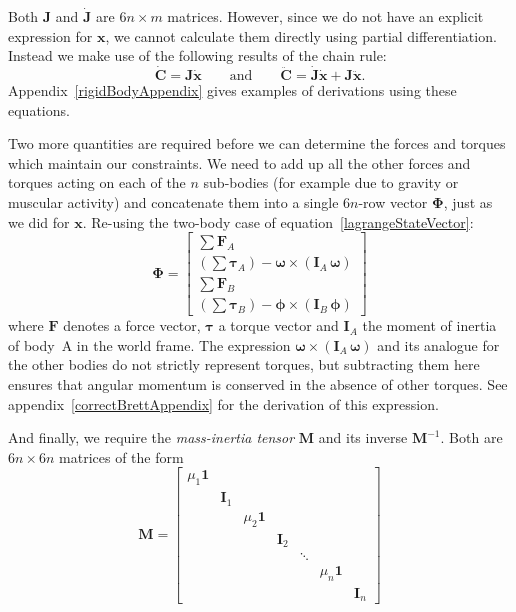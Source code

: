 Both $\mathbf{J}$ and $\dot{\mathbf{J}}$ are $6n\times m$ matrices. However, since we do not
have an explicit expression for $\mathbf{x}$, we cannot calculate them directly using
partial differentiation. Instead we make use of the following results of the chain rule:
\begin{equation}
\dot{\mathbf{C}} = \mathbf{J}\dot{\mathbf{x}} \quad\quad\mathrm{and}\quad\quad
\ddot{\mathbf{C}} = \dot{\mathbf{J}}\dot{\mathbf{x}} + \mathbf{J}\ddot{\mathbf{x}}.
\end{equation}
Appendix~\ref{rigidBodyAppendix} gives examples of derivations using these equations.

Two more quantities are required before we can determine the forces and torques which maintain
our constraints. We need to add up all the other forces and torques acting on each of the $n$
sub-bodies (for example due to gravity or muscular activity) and concatenate them into a single
$6n$-row vector $\bm{\Phi}$, just as we did for $\mathbf{x}$. Re-using the two-body case of
equation~\ref{lagrangeStateVector}:
\begin{equation}
\bm{\Phi} = \left[\begin{array}{l}
    \sum \mathbf{F}_A \\
    \left( \sum \bm{\tau}_A \right) - \bm{\omega}\times(\mathbf{I}_A\,\bm{\omega}) \\
    \sum \mathbf{F}_B \\
    \left( \sum \bm{\tau}_B \right) - \bm{\phi}\times(\mathbf{I}_B\,\bm{\phi})
    \end{array}\right]
\end{equation}
where $\mathbf{F}$ denotes a force vector, $\bm{\tau}$ a torque vector and $\mathbf{I}_A$
the moment of inertia of body~A in the world frame. The expression
$\bm{\omega}\times(\mathbf{I}_A\,\bm{\omega})$ and its analogue for the other bodies do
not strictly represent torques, but subtracting them here ensures that angular momentum is
conserved in the absence of other torques. See appendix~\ref{correctBrettAppendix} for the
derivation of this expression.

And finally, we require the {\em mass-inertia tensor} $\mathbf{M}$ and its inverse
$\mathbf{M}^{-1}$. Both are $6n\times6n$ matrices of the form
\begin{equation}
\label{massInertiaTensor}
\mathbf{M} = \left[ \begin{array}{ccccccc}
    \mu_1\mathbf{1} \\ & \mathbf{I}_1 \\ &&
    \mu_2\mathbf{1} \\ &&& \mathbf{I}_2 \\ &&&& \ddots \\ &&&&&
    \mu_n\mathbf{1} \\ &&&&&& \mathbf{I}_n
    \end{array}\right]
\end{equation}

